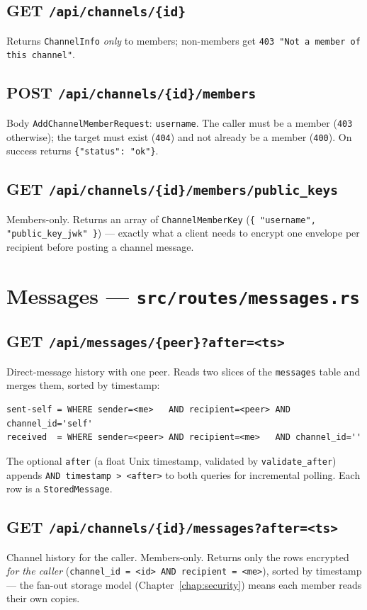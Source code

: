 \subsection*{GET \texttt{/api/channels/\{id\}}}
Returns \verb|ChannelInfo| \emph{only} to members; non-members get
\verb|403 "Not a member of this channel"|.

\subsection*{POST \texttt{/api/channels/\{id\}/members}}
Body \verb|AddChannelMemberRequest|: \verb|username|. The caller must be a member
(\verb|403| otherwise); the target must exist (\verb|404|) and not already be a
member (\verb|400|). On success returns \verb|{"status": "ok"}|.

\subsection*{GET \texttt{/api/channels/\{id\}/members/public\_keys}}
Members-only. Returns an array of \verb|ChannelMemberKey|
(\verb|{ "username", "public_key_jwk" }|) --- exactly what a client needs to
encrypt one envelope per recipient before posting a channel message.

\section{Messages --- \texttt{src/routes/messages.rs}}

\subsection*{GET \texttt{/api/messages/\{peer\}?after=<ts>}}
Direct-message history with one peer. Reads two slices of the \verb|messages|
table and merges them, sorted by timestamp:

\begin{lstlisting}
sent-self = WHERE sender=<me>   AND recipient=<peer> AND channel_id='self'
received  = WHERE sender=<peer> AND recipient=<me>   AND channel_id=''
\end{lstlisting}

The optional \verb|after| (a float Unix timestamp, validated by
\verb|validate_after|) appends \verb|AND timestamp > <after>| to both queries for
incremental polling. Each row is a \verb|StoredMessage|.

\subsection*{GET \texttt{/api/channels/\{id\}/messages?after=<ts>}}
Channel history for the caller. Members-only. Returns only the rows encrypted
\emph{for the caller} (\verb|channel_id = <id> AND recipient = <me>|), sorted by
timestamp --- the fan-out storage model (Chapter~\ref{chap:security}) means each
member reads their own copies.


